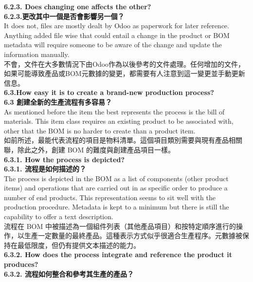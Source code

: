 \documentclass[12pt,a4paper]{report}  %
\begin{document}
\Large\textbf{6.2.3. Does changing one affects the other?}\\
\Large\textbf{6.2.3.更改其中一個是否會影響另一個？}\\

It does not, files are mostly dealt by Odoo as paperwork for later reference. Anything 
added file wise that could entail a change in the product or BOM metadata will require
someone to be aware of the change and update the information manually.\\
不會，文件在大多數情況下由Odoo作為以後參考的文件處理。任何增加的文件，如果可能導致產品或BOM元數據的變更，都需要有人注意到這一變更並手動更新信息。\\

\Large\textbf{6.3.How easy it is to create a brand-new production process?}\\
\Large\textbf{6.3 創建全新的生產流程有多容易？}\\

As mentioned before the item the best represents the process is the bill of materials. This 
item class requires an existing product to be associated with, other that the BOM is no harder 
to create than a product item.\\
如前所述，最能代表流程的項目是物料清單。這個項目類別需要與現有產品相關聯，除此之外，創建 BOM 的難度與創建產品項目一樣。\\

\Large\textbf{6.3.1. How the process is depicted?}\\
\Large\textbf{6.3.1. 流程是如何描述的？}\\

The process is depicted in the BOM as a list of components (other product items) and 
operations that are carried out in as specific order to produce a number of end products. This 
representation seems to sit well with the production procedure. Metadata is kept to a 
minimum but there is still the capability to offer a text description.\\
流程在 BOM 中被描述為一個組件列表（其他產品項目）和按特定順序進行的操作，以生產一定數量的最終產品。這種表示方式似乎很適合生產程序。元數據被保持在最低限度，但仍有提供文本描述的能力。\\

\Large\textbf{6.3.2. How does the process integrate and reference the product it produces?}\\
\Large\textbf{6.3.2. 流程如何整合和參考其生產的產品？}\\
\end{document}
